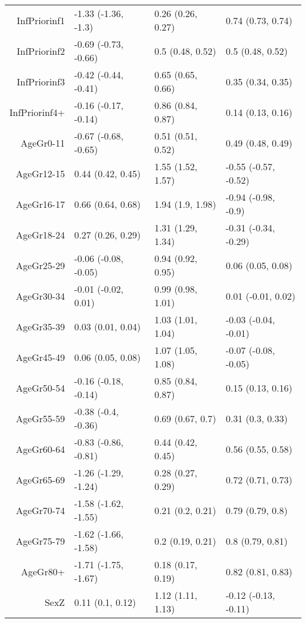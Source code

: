 \begin{table}[ht]
\begin{tabular}{rlll}
  InfPriorinf1 & -1.33 (-1.36, -1.3) & 0.26 (0.26, 0.27) & 0.74 (0.73, 0.74) \\ 
  InfPriorinf2 & -0.69 (-0.73, -0.66) & 0.5 (0.48, 0.52) & 0.5 (0.48, 0.52) \\ 
  InfPriorinf3 & -0.42 (-0.44, -0.41) & 0.65 (0.65, 0.66) & 0.35 (0.34, 0.35) \\ 
  InfPriorinf4+ & -0.16 (-0.17, -0.14) & 0.86 (0.84, 0.87) & 0.14 (0.13, 0.16) \\ 
  AgeGr0-11 & -0.67 (-0.68, -0.65) & 0.51 (0.51, 0.52) & 0.49 (0.48, 0.49) \\ 
  AgeGr12-15 & 0.44 (0.42, 0.45) & 1.55 (1.52, 1.57) & -0.55 (-0.57, -0.52) \\ 
  AgeGr16-17 & 0.66 (0.64, 0.68) & 1.94 (1.9, 1.98) & -0.94 (-0.98, -0.9) \\ 
  AgeGr18-24 & 0.27 (0.26, 0.29) & 1.31 (1.29, 1.34) & -0.31 (-0.34, -0.29) \\ 
  AgeGr25-29 & -0.06 (-0.08, -0.05) & 0.94 (0.92, 0.95) & 0.06 (0.05, 0.08) \\ 
  AgeGr30-34 & -0.01 (-0.02, 0.01) & 0.99 (0.98, 1.01) & 0.01 (-0.01, 0.02) \\ 
  AgeGr35-39 & 0.03 (0.01, 0.04) & 1.03 (1.01, 1.04) & -0.03 (-0.04, -0.01) \\ 
  AgeGr45-49 & 0.06 (0.05, 0.08) & 1.07 (1.05, 1.08) & -0.07 (-0.08, -0.05) \\ 
  AgeGr50-54 & -0.16 (-0.18, -0.14) & 0.85 (0.84, 0.87) & 0.15 (0.13, 0.16) \\ 
  AgeGr55-59 & -0.38 (-0.4, -0.36) & 0.69 (0.67, 0.7) & 0.31 (0.3, 0.33) \\ 
  AgeGr60-64 & -0.83 (-0.86, -0.81) & 0.44 (0.42, 0.45) & 0.56 (0.55, 0.58) \\ 
  AgeGr65-69 & -1.26 (-1.29, -1.24) & 0.28 (0.27, 0.29) & 0.72 (0.71, 0.73) \\ 
  AgeGr70-74 & -1.58 (-1.62, -1.55) & 0.21 (0.2, 0.21) & 0.79 (0.79, 0.8) \\ 
  AgeGr75-79 & -1.62 (-1.66, -1.58) & 0.2 (0.19, 0.21) & 0.8 (0.79, 0.81) \\ 
  AgeGr80+ & -1.71 (-1.75, -1.67) & 0.18 (0.17, 0.19) & 0.82 (0.81, 0.83) \\ 
  SexZ & 0.11 (0.1, 0.12) & 1.12 (1.11, 1.13) & -0.12 (-0.13, -0.11) \\ 
   \hline
\end{tabular}
\end{table}
